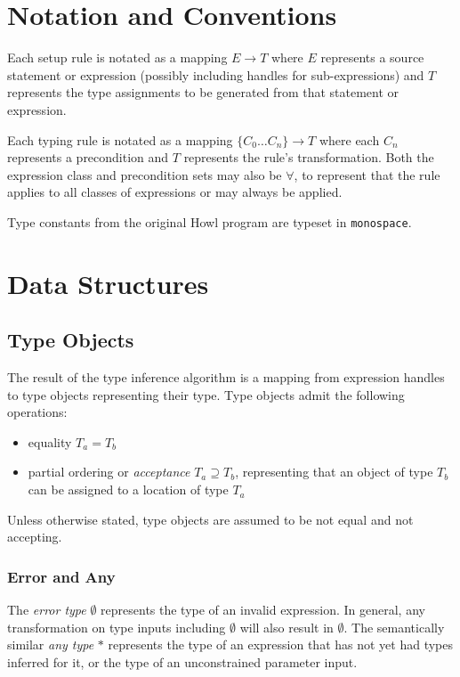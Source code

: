 \documentclass{article}
\begin{document}
\section{Notation and Conventions}

Each setup rule is notated as a mapping $E \to T$ where $E$ represents a source statement or expression (possibly including handles for sub-expressions) and $T$ represents the type assignments to be generated from that statement or expression.

Each typing rule is notated as a mapping $\{C_0 \ldots C_n\} \to T$ where each $C_n$ represents a precondition and $T$ represents the rule's transformation.
Both the expression class and precondition sets may also be $\forall$, to represent that the rule applies to all classes of expressions or may always be applied.

Type constants from the original Howl program are typeset in \texttt{monospace}.

\section{Data Structures}

\subsection{Type Objects}

The result of the type inference algorithm is a mapping from expression handles to type objects representing their type.
Type objects admit the following operations:

\begin{itemize}
    \item equality $T_a = T_b$
    \item partial ordering or \textit{acceptance} $T_a \supseteq T_b$, representing that an object of type $T_b$ can be assigned to a location of type $T_a$
\end{itemize}

Unless otherwise stated, type objects are assumed to be not equal and not accepting.

\subsubsection{Error and Any}

The \textit{error type} $\emptyset$ represents the type of an invalid expression.
In general, any transformation on type inputs including $\emptyset$ will also result in $\emptyset$.
The semantically similar \textit{any type} $\ast$ represents the type of an expression that has not yet had types inferred for it, or the type of an unconstrained parameter input.
\end{document}
